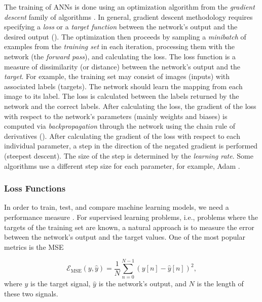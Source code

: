 The training of \acp{ANN} is done using an optimization algorithm from the \emph{gradient descent} family of algorithms \cite{Goodfellow-et-al-2016}. In general, gradient descent methodology requires specifying a \emph{loss} or a \emph{target function} between the network's output and the desired output (). The optimization then proceeds by sampling a \emph{minibatch} of examples from the \emph{training set} in each iteration, processing them with the network (the \emph{forward pass}), and calculating the loss. The loss function is a measure of dissimilarity (or distance) between the network's output and the \emph{target}. For example, the training set may consist of images (inputs) with associated labels (targets). The network should learn the mapping from each image to its label. The loss is calculated between the labels returned by the network and the correct labels. After calculating the loss, the gradient of the loss with respect to the network's parameters (mainly weights and biases) is computed via \emph{backpropagation} through the network using the chain rule of derivatives (). After calculating the gradient of the loss with respect to each individual parameter, a step in the direction of the negated gradient is performed (steepest descent). The size of the step is determined by the \emph{learning rate}. Some algorithms use a different step size for each parameter, for example, Adam \cite{Kingma2017}.

\subsubsection{Loss Functions}
\label{sec:loss_functions}

In order to train, test, and compare machine learning models, we need a performance measure \cite{Goodfellow-et-al-2016}. For supervised learning problems, i.e., problems where the targets of the training set are known, a natural approach is to measure the error between the network's output and the target values. One of the most popular metrics is the \ac{MSE}

\begin{equation}
  \mathcal{E}_\text{MSE}(y, \hat{y}) = \frac{1}{N} \sum \limits_{n=0}^{N-1} (y[n] - \hat{y}[n])^2,
\end{equation}
where $y$ is the target signal, $\hat{y}$ is the network's output, and $N$ is the length of these two signals.

